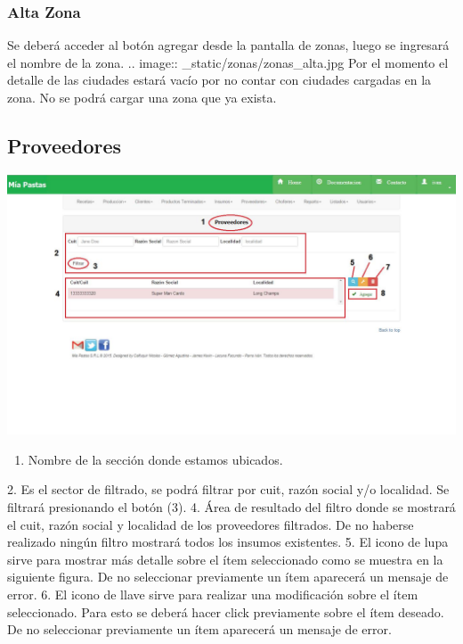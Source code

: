 \documentclass[letterpaper,10pt,english]{sphinxmanual}
\begin{document}
\subsubsection{{}Alta Zona}
\label{zonas alta:alta-zona}\label{zonas alta::doc}
Se deberá acceder al botón agregar desde la pantalla de zonas, luego se ingresará el nombre de la zona.
.. image:: \_static/zonas/zonas\_alta.jpg
Por el momento el detalle de las ciudades estará vacío por no contar con ciudades cargadas en la zona.
No se podrá cargar una zona que ya exista.


\subsection{{}Proveedores}
\label{proveedores:proveedores}\label{proveedores::doc}
\includegraphics{proveedor_ini.jpg}
\begin{enumerate}
\item {} 
Nombre de la sección donde estamos ubicados.

\end{enumerate}

2.      Es el sector de filtrado, se podrá filtrar por cuit, razón social y/o localidad. Se filtrará presionando el botón (3).
4.      Área de resultado del filtro donde se mostrará el cuit, razón social y localidad de los proveedores filtrados. De no haberse realizado ningún filtro mostrará todos los insumos existentes.
5.      El icono de lupa sirve para mostrar más detalle sobre el ítem seleccionado como se muestra en la siguiente figura. De no seleccionar previamente un ítem aparecerá un mensaje de error.
6.      El icono de llave sirve para realizar una modificación sobre el ítem seleccionado. Para esto se deberá hacer click previamente sobre el ítem deseado. De no seleccionar previamente un ítem aparecerá un mensaje de error.
\end{document}
